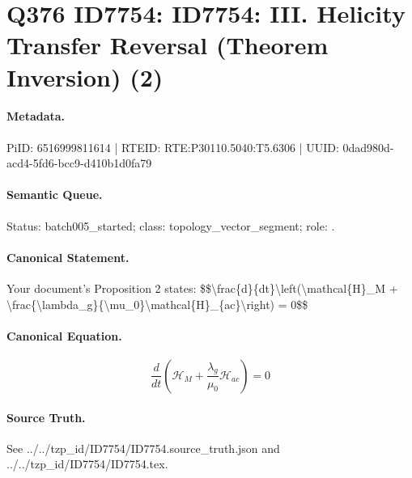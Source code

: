 \section*{Q376 ID7754: ID7754: III. Helicity Transfer Reversal (Theorem Inversion) (2)}
\paragraph{Metadata.}
PiID: 6516999811614 | RTEID: RTE:P30110.5040:T5.6306 | UUID: 0dad980d-acd4-5fd6-bcc9-d410b1d0fa79

\paragraph{Semantic Queue.}
Status: batch005\_started; class: topology\_vector\_segment; role: .

\paragraph{Canonical Statement.}
Your document's Proposition 2 states: \$\$\textbackslash{}frac\{d\}\{dt\}\textbackslash{}left(\textbackslash{}mathcal\{H\}\_M + \textbackslash{}frac\{\textbackslash{}lambda\_g\}\{\textbackslash{}mu\_0\}\textbackslash{}mathcal\{H\}\_\{ac\}\textbackslash{}right) = 0\$\$

\paragraph{Canonical Equation.}
\[
\frac{d}{dt}\left(\mathcal{H}_M + \frac{\lambda_g}{\mu_0}\mathcal{H}_{ac}\right) = 0
\]

\paragraph{Source Truth.}
See ../../tzp\_id/ID7754/ID7754.source\_truth.json and ../../tzp\_id/ID7754/ID7754.tex.
